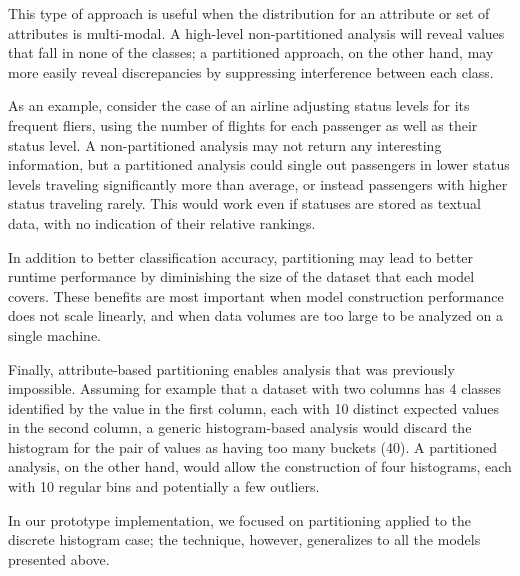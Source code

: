 This type of approach is useful when the distribution for an attribute or set of attributes is multi-modal. A high-level non-partitioned analysis will reveal values that fall in none of the classes; a partitioned approach, on the other hand, may more easily reveal discrepancies by suppressing interference between each class.

As an example, consider the case of an airline adjusting status levels for its frequent fliers, using the number of flights for each passenger as well as their status level. A non-partitioned analysis may not return any interesting information, but a partitioned analysis could single out passengers in lower status levels traveling significantly more than average, or instead passengers with higher status traveling rarely. This would work even if statuses are stored as textual data, with no indication of their relative rankings.

In addition to better classification accuracy, partitioning may lead to better runtime performance by diminishing the size of the dataset that each model covers. These benefits are most important when model construction performance does not scale linearly, and when data volumes are too large to be analyzed on a single machine.

Finally, attribute-based partitioning enables analysis that was previously impossible. Assuming for example that a dataset with two columns has 4 classes identified by the value in the first column, each with 10 distinct expected values in the second column, a generic histogram-based analysis would discard the histogram for the pair of values as having too many buckets (40). A partitioned analysis, on the other hand, would allow the construction of four histograms, each with 10 regular bins and potentially a few outliers.

In our prototype implementation, we focused on partitioning applied to the discrete histogram case; the technique, however, generalizes to all the models presented above.

